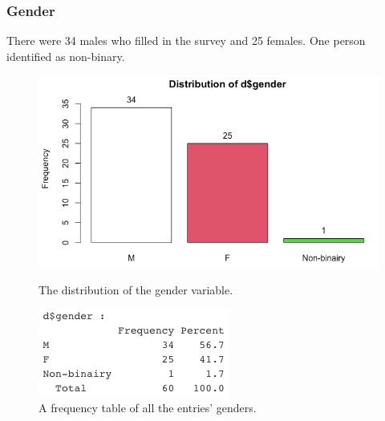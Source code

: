 \subsubsection{Gender}
There were 34 males who filled in the survey and 25 females. One person identified as non-binary.
\begin{figure}[!htb]
	\includegraphics[width=\linewidth]{../LaTeX/Figures/Environments/GenderPlot.png}
	\caption{The distribution of the gender variable.}\label{fig:genderPlot}
	\endminipage\hfill
	\includegraphics[width=\linewidth]{../LaTeX/Figures/Environments/GenderFreq.png}
	\caption{A frequency table of all the entries' genders.}\label{fig:genderFreq}
	\endminipage\hfill
\end{figure}

